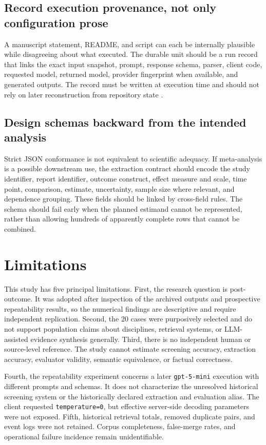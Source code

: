 \documentclass[acmsmall,anonymous,review]{acmart}
\begin{document}
\subsection{Record execution provenance, not only configuration prose}

A manuscript statement, README, and script can each be internally plausible while disagreeing about what executed. The durable unit should be a run record that links the exact input snapshot, prompt, response schema, parser, client code, requested model, returned model, provider fingerprint when available, and generated outputs. The record must be written at execution time and should not rely on later reconstruction from repository state \cite{w3cprov2013,davidson2008provenance,polyzotis2021mlmd}.

\subsection{Design schemas backward from the intended analysis}

Strict JSON conformance is not equivalent to scientific adequacy. If meta-analysis is a possible downstream use, the extraction contract should encode the study identifier, report identifier, outcome construct, effect measure and scale, time point, comparison, estimate, uncertainty, sample size where relevant, and dependence grouping. These fields should be linked by cross-field rules. The schema should fail early when the planned estimand cannot be represented, rather than allowing hundreds of apparently complete rows that cannot be combined.

\section{Limitations}

This study has five principal limitations. First, the research question is post-outcome. It was adopted after inspection of the archived outputs and prospective repeatability results, so the numerical findings are descriptive and require independent replication. Second, the 20 cases were purposively selected and do not support population claims about disciplines, retrieval systems, or LLM-assisted evidence synthesis generally. Third, there is no independent human or source-level reference. The study cannot estimate screening accuracy, extraction accuracy, evaluator validity, semantic equivalence, or factual correctness.

Fourth, the repeatability experiment concerns a later \texttt{gpt-5-mini} execution with different prompts and schemas. It does not characterize the unresolved historical screening system or the historically declared extraction and evaluation alias. The client requested \texttt{temperature=0}, but effective server-side decoding parameters were not exposed. Fifth, historical retrieval totals, removed duplicate pairs, and event logs were not retained. Corpus completeness, false-merge rates, and operational failure incidence remain unidentifiable.
\end{document}

